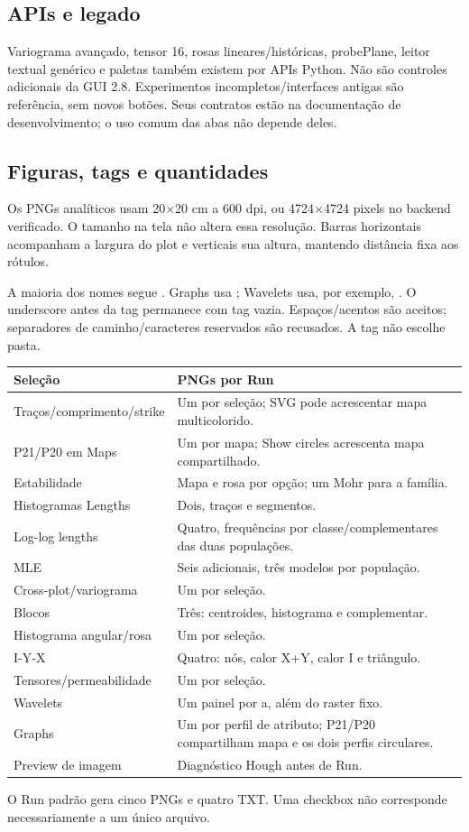 \subsection{APIs e legado}
Variograma avançado, tensor 16, rosas lineares/históricas, probePlane, leitor textual genérico e paletas também existem por APIs Python. Não são controles adicionais da GUI 2.8. Experimentos incompletos/interfaces antigas são referência, sem novos botões. Seus contratos estão na documentação de desenvolvimento; o uso comum das abas não depende deles.

\label{sec:exports}
\subsection{Figuras, tags e quantidades}
Os PNGs analíticos usam 20\(\times\)20 cm a 600 dpi, ou 4724\(\times\)4724 pixels no backend verificado. O tamanho na tela não altera essa resolução. Barras horizontais acompanham a largura do plot e verticais sua altura, mantendo distância fixa aos rótulos.

A maioria dos nomes segue . Graphs usa ; Wavelets usa, por exemplo, . O underscore antes da tag permanece com tag vazia. Espaços/acentos são aceitos; separadores de caminho/caracteres reservados são recusados. A tag não escolhe pasta.
\begin{longtable}{@{}p{.29\linewidth}p{.63\linewidth}@{}}
\toprule Seleção & PNGs por Run\\\midrule\endhead
Traços/comprimento/strike & Um por seleção; SVG pode acrescentar mapa multicolorido.\\
P21/P20 em Maps & Um por mapa; Show circles acrescenta mapa compartilhado.\\
Estabilidade & Mapa e rosa por opção; um Mohr para a família.\\
Histogramas Lengths & Dois, traços e segmentos.\\
Log-log lengths & Quatro, frequências por classe/complementares das duas populações.\\
MLE & Seis adicionais, três modelos por população.\\
Cross-plot/variograma & Um por seleção.\\
Blocos & Três: centroides, histograma e complementar.\\
Histograma angular/rosa & Um por seleção.\\
I-Y-X & Quatro: nós, calor X+Y, calor I e triângulo.\\
Tensores/permeabilidade & Um por seleção.\\
Wavelets & Um painel por a, além do raster fixo.\\
Graphs & Um por perfil de atributo; P21/P20 compartilham mapa e os dois perfis circulares.\\
Preview de imagem & Diagnóstico Hough antes de Run.\\\bottomrule
\end{longtable}
O Run padrão gera cinco PNGs e quatro TXT. Uma checkbox não corresponde necessariamente a um único arquivo.

